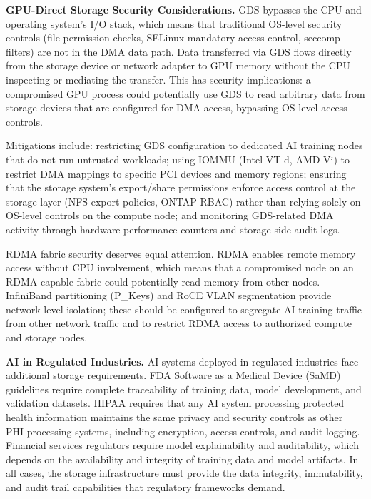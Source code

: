 \begin{securitybox}
\textbf{GPU-Direct Storage Security Considerations.}
GDS bypasses the CPU and operating system's I/O stack, which means that traditional OS-level security controls (file permission checks, SELinux mandatory access control, seccomp filters) are not in the DMA data path. Data transferred via GDS flows directly from the storage device or network adapter to GPU memory without the CPU inspecting or mediating the transfer. This has security implications: a compromised GPU process could potentially use GDS to read arbitrary data from storage devices that are configured for DMA access, bypassing OS-level access controls.

Mitigations include: restricting GDS configuration to dedicated AI training nodes that do not run untrusted workloads; using IOMMU (Intel VT-d, AMD-Vi) to restrict DMA mappings to specific PCI devices and memory regions; ensuring that the storage system's export/share permissions enforce access control at the storage layer (NFS export policies, ONTAP RBAC) rather than relying solely on OS-level controls on the compute node; and monitoring GDS-related DMA activity through hardware performance counters and storage-side audit logs.

RDMA fabric security deserves equal attention. RDMA enables remote memory access without CPU involvement, which means that a compromised node on an RDMA-capable fabric could potentially read memory from other nodes. InfiniBand partitioning (P\_Keys) and RoCE VLAN segmentation provide network-level isolation; these should be configured to segregate AI training traffic from other network traffic and to restrict RDMA access to authorized compute and storage nodes.

\textbf{AI in Regulated Industries.}
AI systems deployed in regulated industries face additional storage requirements. FDA Software as a Medical Device (SaMD) guidelines require complete traceability of training data, model development, and validation datasets. HIPAA requires that any AI system processing protected health information maintains the same privacy and security controls as other PHI-processing systems, including encryption, access controls, and audit logging. Financial services regulators require model explainability and auditability, which depends on the availability and integrity of training data and model artifacts. In all cases, the storage infrastructure must provide the data integrity, immutability, and audit trail capabilities that regulatory frameworks demand.


\end{securitybox}
